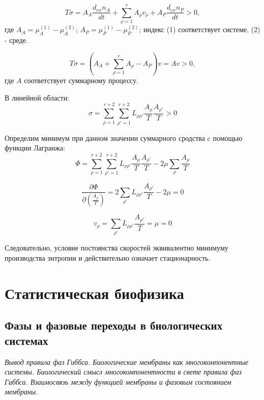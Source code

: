 \documentclass[12pt,a4paper,oneside]{book}
\begin{document}
\begin{equation}
	T \sigma = A_A  \frac{d_{ex} n_A}{d t} + \sum_{\rho=1}^{r} A_{\rho} v_{\rho} + A_P \frac{d_{ex} n_P}{d t} > 0,
\end{equation}
где $A_A = \mu_{A}^{(1)} -  \mu_{A}^{(2)}; \, A_P = \mu_{P}^{(1)} -  \mu_{P}^{(2)}$; индекс (1) соответствует системе, (2) - среде.

\begin{equation}
	T \sigma = ( A_A + \sum_{\rho=1}^{r} A_{\rho} - A_P ) v = A v > 0,
\end{equation}
где $A$ соответствует суммарному процессу.

В линейной области:
\begin{equation}
	\sigma = \sum_{\rho=1}^{r+2} \sum_{\rho'=1}^{r+2} L_{\rho \rho'} \frac{A_{\rho}}{T} \frac{A_{\rho'}}{T} >0
\end{equation}

Определим минимум при данном значении суммарного сродства c помощью функции Лагранжа:
\begin{equation}
	\Phi = \sum_{\rho=1}^{r+2} \sum_{\rho'=1}^{r+2} 			L_{\rho \rho'} \frac{A_{\rho}}{T} \frac{A_{\rho'}}{T} 	- 2 \mu \sum_{\rho} \frac{A_{\rho}}{T}
\end{equation}

\begin{equation}
 \frac{\partial \Phi}{\partial (\frac{A_{\rho}}{T})} = 2 \sum_{\rho'} L_{\rho \rho'} \frac{A_{\rho'}}{T} - 2 \mu = 0
\end{equation}

\begin{equation}
 v_{\rho} = \sum_{\rho'} L_{\rho \rho'} \frac{A_{\rho'}}{T} = \mu = 0
\end{equation}

Следовательно, условие постоянства скоростей эквивалентно минимуму производства энтропии и действительно означает стационарность.



\chapter{Статистическая биофизика}


\section{Фазы и фазовые переходы в биологических системах}
{\it Вывод правила фаз Гиббса. Биологические мембраны как многокомпонентные системы. Биологический смысл многокомпонентности в свете правила фаз Гиббса. Взаимосвязь между функцией мембраны и фазовым состоянием мембраны.}
\end{document}
